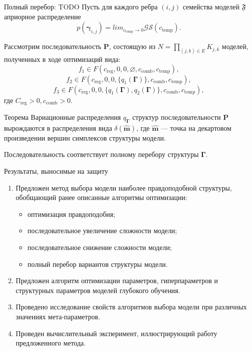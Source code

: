 \documentclass[usenames,dvipsnames,11pt,pdf,utf8,russian,aspectratio=43]{beamer}
\begin{document}
\begin{frame}{Полный перебор: TODO}
\small
Пусть для каждого ребра $(i,j)$ семейства моделей $\mathfrak{F}$ априорное распределение $$p(\boldsymbol{\gamma}_{i,j}) =  lim_{c_{\text{temp}} \to 0} \mathcal{GS}(c_{\text{temp}}).$$

Рассмотрим последовательность $\mathbf{P}$, состоящую из $N = \prod_{(j,k) \in E} K_{j,k}$ моделей, полученных в ходе оптимизаций вида:
$$f_1 \in F(c_{\text{reg}}, 0, 0, \varnothing, c_{\text{comb}},  c_{\text{temp}}),$$
$$f_2 \in F(c_{\text{reg}}, 0, 0, \{q_1(\boldsymbol{\Gamma})\},  c_{\text{comb}},  c_{\text{temp}}),$$
$$f_3 \in F(c_{\text{reg}}, 0, 0, \{q_1(\boldsymbol{\Gamma}), q_2(\boldsymbol{\Gamma})\},  c_{\text{comb}},  c_{\text{temp}}),$$
где $C_{\text{reg}} > 0,  c_{\text{comb}}>0$.


\begin{block}{Теорема}
Вариационные распределения $q_{\boldsymbol{\Gamma}}$ структур  последовательности $\mathbf{P}$ вырождаются в распределения вида $\delta(\hat{\mathbf{m}})$, где $\hat{\mathbf{m}}$ --- точка на декартовом произведении вершин симплексов структуры модели.

Последовательность соответствует полному перебору структуры $\boldsymbol{\Gamma}$.
\end{block}
\end{frame}


\begin{frame}{Результаты, выносимые на защиту}
\begin{enumerate}
\item Предложен метод выбора модели наиболее правдоподобной структуры, обобщающий ранее описанные алгоритмы оптимизации:
\begin{itemize}
\item оптимизация правдоподобия;
\item последовательное увеличение сложности модели;
\item последовательное снижение сложности модели;
\item полный перебор вариантов структуры модели.
\end{itemize}

\item Предложен алгоритм оптимизации параметров, гиперпараметров и структурных
параметров моделей глубокого обучения.

\item Проведено исследование свойств алгоритмов выбора модели при различных значениях мета-параметров.

\item Проведен вычислительный эксперимент, иллюстрирующий работу предложенного метода.

\end{enumerate}
\end{frame}
\end{document}
